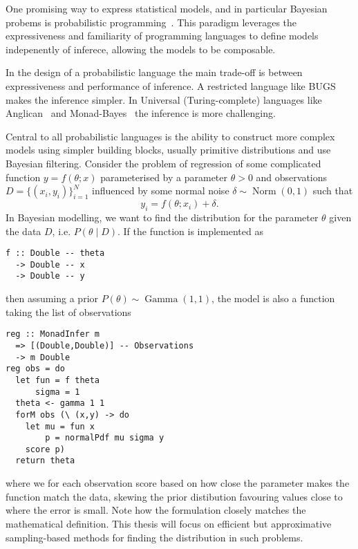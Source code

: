 One promising way to express statistical models, and in particular Bayesian probems is probabilistic programming~\cite{dippl}. This paradigm leverages the expressiveness and familiarity of programming
languages  to define models indepenently of inferece, allowing the models to be composable.

In the design of a probabilistic language the main trade-off is between
expressiveness and performance of inference. A restricted language like
BUGS~\cite{bugs} makes the inference simpler. In Universal
(Turing-complete) languages like Anglican~\cite{anglican} and
Monad-Bayes~\cite{mbayes} the inference is more challenging.

Central to all probabilistic languages is the ability to construct more
complex models using simpler building blocks, usually primitive distributions
and use Bayesian filtering. Consider the problem of regression of some complicated function $y = f(\theta;x)$ parameterised by a parameter $\theta > 0$ and observations $D = \{ (x_i,y_i) \}_{i=1}^N$ influenced by some normal noise $\delta \sim \operatorname{Norm}(0,1)$ such that
\begin{equation}
   y_i = f(\theta;x_i) + \delta .
\end{equation}
In Bayesian modelling, we want to find the distribution for the parameter $\theta$ given the data $D$, i.e. $P(\theta \mid D)$. If the function is implemented as
\begin{verbatim}
f :: Double -- theta
  -> Double -- x
  -> Double -- y
\end{verbatim}
then assuming a prior $P(\theta) \sim \operatorname{Gamma}(1,1)$, the model is also a function taking the list of observations
\begin{verbatim}
reg :: MonadInfer m
  => [(Double,Double)] -- Observations
  -> m Double
reg obs = do
  let fun = f theta
      sigma = 1
  theta <- gamma 1 1
  forM obs (\ (x,y) -> do
    let mu = fun x
        p = normalPdf mu sigma y
    score p)
  return theta
\end{verbatim}
where we for each observation score based on how close the parameter makes the function match the data, skewing the prior distibution favouring values close to where the error is small. Note how the formulation closely matches the mathematical definition. This thesis will focus on efficient but approximative sampling-based
methods for finding the distribution in such problems.

